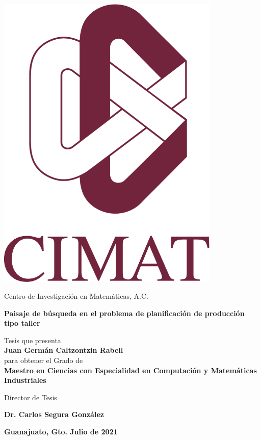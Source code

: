 \begin{minipage}{0.18\textwidth}
	\includegraphics[width=0.8\textwidth]{Imagenes/cimatlogo.png}
\end{minipage}%
\begin{minipage}{0.82\textwidth}
\begin{center}
	\large \sc Centro de Investigaci{\'o}n en Matemáticas, A.C.
\end{center}
\end{minipage}
\begin{center}
\Huge \bf Paisaje de búsqueda en el problema de planificación de producción tipo taller
\end{center}

\begin{center}
{\LARGE  Tesis que presenta}\\ \vspace{0.5cm}
{\LARGE \bf Juan Germán Caltzontzin Rabell} \\ \vspace{1cm}
{\LARGE  para obtener el Grado de}\\ \vspace{0.5cm}
\LARGE \bf Maestro en Ciencias con Especialidad en Computación y Matemáticas Industriales
\end{center}

\centerline{\LARGE  Director de Tesis}
\vspace{0.5cm}
\centerline{\LARGE \bf  Dr. Carlos Segura González }
 
\vspace{1.2cm}
{\large \bf \hfill Guanajuato, Gto. Julio de 2021}

\pagebreak

\clearpage  \clearpage \clearpage
